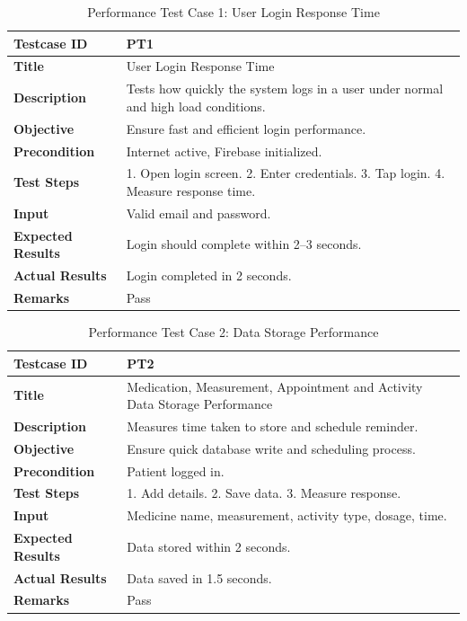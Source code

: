 \documentclass[12pt, a4paper, oneside]{report}
\begin{document}
\begin{table}[H]
\centering
\caption{Performance Test Case 1: User Login Response Time}
\begin{tabularx}{\textwidth}{|l|X|}
\hline
\textbf{Testcase ID} & PT1 \\ \hline
\textbf{Title} & User Login Response Time \\ \hline
\textbf{Description} & Tests how quickly the system logs in a user under normal and high load conditions. \\ \hline
\textbf{Objective} & Ensure fast and efficient login performance. \\ \hline
\textbf{Precondition} & Internet active, Firebase initialized. \\ \hline
\textbf{Test Steps} & 1. Open login screen. 2. Enter credentials. 3. Tap login. 4. Measure response time. \\ \hline
\textbf{Input} & Valid email and password. \\ \hline
\textbf{Expected Results} & Login should complete within 2--3 seconds. \\ \hline
\textbf{Actual Results} & Login completed in 2 seconds. \\ \hline
\textbf{Remarks} & Pass \\ \hline
\end{tabularx}
\end{table}

\begin{table}[H]
\centering
\caption{Performance Test Case 2: Data Storage Performance}
\begin{tabularx}{\textwidth}{|l|X|}
\hline
\textbf{Testcase ID} & PT2 \\ \hline
\textbf{Title} & Medication, Measurement, Appointment and Activity Data Storage Performance \\ \hline
\textbf{Description} & Measures time taken to store and schedule reminder. \\ \hline
\textbf{Objective} & Ensure quick database write and scheduling process. \\ \hline
\textbf{Precondition} & Patient logged in. \\ \hline
\textbf{Test Steps} & 1. Add details. 2. Save data. 3. Measure response. \\ \hline
\textbf{Input} & Medicine name, measurement, activity type, dosage, time. \\ \hline
\textbf{Expected Results} & Data stored within 2 seconds. \\ \hline
\textbf{Actual Results} & Data saved in 1.5 seconds. \\ \hline
\textbf{Remarks} & Pass \\ \hline
\end{tabularx}
\end{table}
\end{document}
